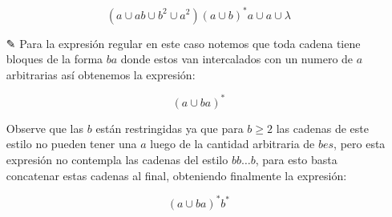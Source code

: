 \begin{itemize}
     $$(a\cup ab \cup b^2 \cup a^2)(a \cup b)^*a \cup a \cup \lambda$$

     \item[✎] Para la expresión regular en este caso notemos que toda cadena tiene bloques de la forma $ba$ donde estos van intercalados con un numero de $a$ arbitrarias así obtenemos la expresión:

     $$(a\cup ba)^*$$

     Observe que las $b$ están restringidas ya que para $b\geq 2$ las cadenas de este estilo no pueden tener una $a$ luego de la cantidad arbitraria de $bes$, pero esta expresión no contempla las cadenas del estilo $bb\dots b$, para esto basta concatenar estas cadenas al final, obteniendo finalmente la expresión:

     $$(a\cup ba)^*b^*$$

\end{itemize}

